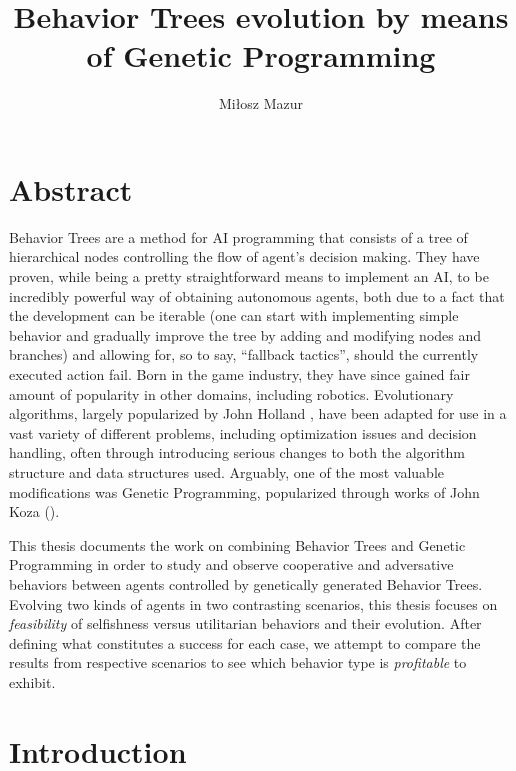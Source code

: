 \documentclass[12pt]{scrreprt}
\begin{document}
\author{Miłosz Mazur}
\title{Behavior Trees evolution by means of Genetic Programming}
\maketitle

\newpage
\chapter*{Abstract}
Behavior Trees are a method for AI programming that consists of a tree of hierarchical nodes controlling the flow of agent's decision making. They have proven, while being a pretty straightforward means to implement an AI, to be incredibly powerful way of obtaining autonomous agents, both due to a fact that the development can be iterable (one can start with implementing simple behavior and gradually improve the tree by adding and modifying nodes and branches) and allowing for, so to say, ``fallback tactics'', should the currently executed action fail.  Born in the game industry, they have since gained fair amount of popularity in other domains, including robotics.
Evolutionary algorithms, largely popularized by John Holland \cite{hollandadaptation}, have been adapted for use in a vast variety of different problems, including optimization issues and decision handling, often through introducing serious changes to both the algorithm structure and data structures used. Arguably, one of the most valuable modifications was Genetic Programming, popularized through works of John Koza (\cite{kozagp}).

This thesis documents the work on combining Behavior Trees and Genetic Programming in order to study and observe cooperative and adversative behaviors between agents controlled by genetically generated Behavior Trees. Evolving two kinds of agents in two contrasting scenarios, this thesis focuses on \textit{feasibility} of selfishness versus utilitarian behaviors and their evolution. After defining what constitutes a success for each case, we attempt to compare the results from respective scenarios to see which behavior type is \textit{profitable} to exhibit.

% 
\tableofcontents
\listoffigures
\listoftables
\chapter{Introduction}
\label{chapter_introduction}

\end{document}

